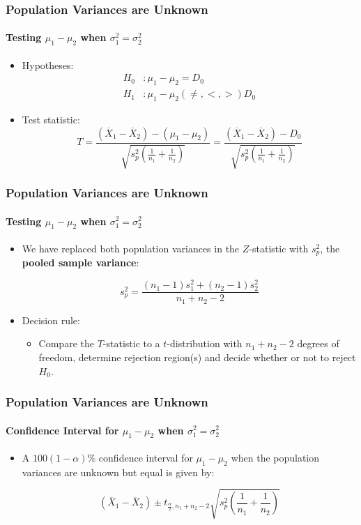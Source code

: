 \documentclass[12pt]{beamer}
\begin{document}
	\begin{frame}
		\frametitle{Population Variances are Unknown}
		\framesubtitle{Testing $\mu_1 - \mu_2$ when $\sigma_1^2 = \sigma_2^2$}
		
		\begin{itemize}[label={\color{blue}$\blacktriangleright$}]
			\item Hypotheses:
			\[
			\begin{aligned}
				H_0 &: \mu_1 - \mu_2 = D_0 \\
				H_1 &: \mu_1 - \mu_2 (\neq, <, >) D_0
			\end{aligned}
			\]
			
			\item Test statistic:
			\[
			T = \frac{(\overline{X}_1 - \overline{X}_2) - (\mu_1 - \mu_2)}{\sqrt{s_p^2 \left(\frac{1}{n_1} + \frac{1}{n_2}\right)}} 
			= \frac{(\overline{X}_1 - \overline{X}_2) - D_0}{\sqrt{s_p^2 \left(\frac{1}{n_1} + \frac{1}{n_2}\right)}}
			\]
		\end{itemize}
		
	\end{frame}
	\begin{frame}
		\frametitle{Population Variances are Unknown}
		\framesubtitle{Testing $\mu_1 - \mu_2$ when $\sigma_1^2 = \sigma_2^2$}
		
		\begin{itemize}[label={\color{blue}$\blacktriangleright$}]
			\item We have replaced both population variances in the $Z$-statistic with $s_p^2$, the \textbf{pooled sample variance}:
			
			\[
			s_p^2 = \frac{(n_1 - 1)s_1^2 + (n_2 - 1)s_2^2}{n_1 + n_2 - 2}
			\]
			
			\item Decision rule:
			\begin{itemize}[label={\color{blue}$\blacktriangleright$}]
				\item Compare the $T$-statistic to a $t$-distribution with $n_1 + n_2 - 2$ degrees of freedom, determine rejection region(s) and decide whether or not to reject $H_0$.
			\end{itemize}
		\end{itemize}
		
	\end{frame}
	\begin{frame}
		\frametitle{Population Variances are Unknown}
		\framesubtitle{Confidence Interval for $\mu_1 - \mu_2$ when $\sigma_1^2 = \sigma_2^2$}
		
		\begin{itemize}[label={\color{blue}$\blacktriangleright$}]
			\item A $100(1 - \alpha)\%$ confidence interval for $\mu_1 - \mu_2$ when the population variances are unknown but equal is given by:
			
			\[
			(\overline{X}_1 - \overline{X}_2) \pm t_{\frac{\alpha}{2},n_1+n_2-2}\sqrt{s_p^2 \left(\frac{1}{n_1} + \frac{1}{n_2}\right)}
			\]
		\end{itemize}
		
	\end{frame}
\end{document}
